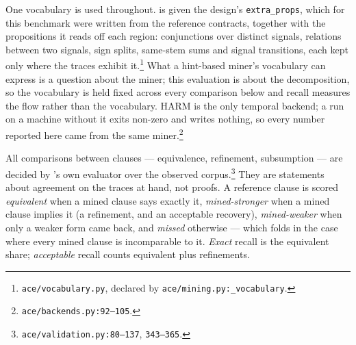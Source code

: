 One vocabulary is used throughout. \ACE{} is given the design's \texttt{extra\_props},
which for this benchmark were written from the reference contracts, together with the
propositions it reads off each region: conjunctions over distinct signals, relations between
two signals, sign splits, same-stem sums and signal transitions, each kept only where the
traces exhibit it.\footnote{\texttt{ace/vocabulary.py}, declared by
\texttt{ace/mining.py:\_vocabulary}.} What a hint-based miner's vocabulary can express is a
question about the miner; this evaluation is about the decomposition, so the vocabulary is
held fixed across every comparison below and recall measures the flow rather than the
vocabulary. HARM is the only temporal backend; a run on a machine without it exits non-zero
and writes nothing, so every number reported here came from the same
miner.\footnote{\texttt{ace/backends.py:92--105}.}

All comparisons between clauses --- equivalence, refinement, subsumption --- are decided by
\ACE{}'s own evaluator over the observed corpus.\footnote{\texttt{ace/validation.py:80--137},
\texttt{343--365}.} They are statements about agreement on the traces at hand, not proofs.
A reference clause is scored \emph{equivalent} when a mined clause says exactly it,
\emph{mined-stronger} when a mined clause implies it (a refinement, and an acceptable
recovery), \emph{mined-weaker} when only a weaker form came back, and \emph{missed}
otherwise --- which folds in the case where every mined clause is incomparable to it.
\emph{Exact} recall is the equivalent share; \emph{acceptable} recall counts equivalent plus
refinements.

